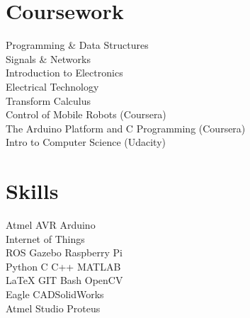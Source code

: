 \documentclass[letterpaper]{deedy-resume} %
\begin{document}
\begin{minipage}[t]{0.33\textwidth}
\sectionspace %


\section{Coursework}



Programming \& Data Structures\\
Signals \& Networks\\
Introduction to Electronics\\
Electrical Technology\\
Transform Calculus\\


Control of Mobile Robots (Coursera)\\
The Arduino Platform and C Programming (Coursera)\\
Intro to Computer Science (Udacity)\\

\sectionspace %


\section{Skills}

Atmel AVR \textbullet{} Arduino \textbullet{}\\ Internet of Things \textbullet{} \\ROS  \textbullet{} Gazebo \textbullet{} Raspberry Pi\\
\sectionspace
{}
Python \textbullet{} C  \textbullet{} C++\textbullet{} MATLAB \textbullet{} \\ \LaTeX \textbullet{} GIT \textbullet{} Bash \textbullet OpenCV\\
\sectionspace
{}
Eagle CAD\textbullet SolidWorks \textbullet\\ Atmel Studio \textbullet Proteus



\end{minipage}
\end{document}
